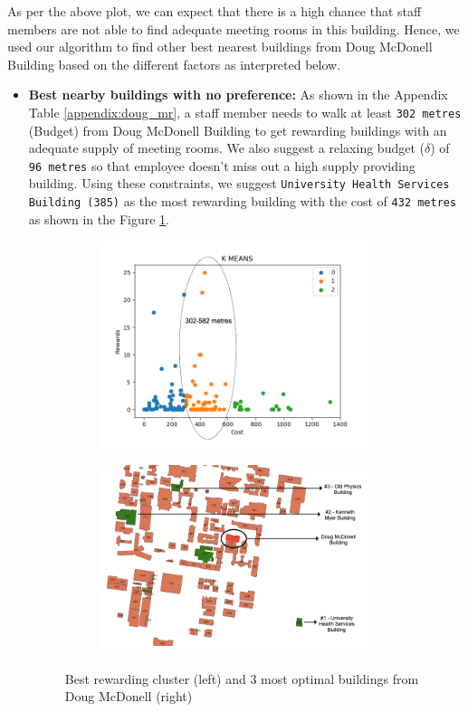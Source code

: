 As per the above plot, we can expect that there is a high chance that staff members are not able to find adequate meeting rooms in this building. Hence, we used our algorithm to find other best nearest buildings from Doug McDonell Building based on the different factors as interpreted below.

\begin{itemize}
    \item \textbf{Best nearby buildings with no preference:} As shown in the Appendix Table \ref{appendix:doug_mr}, a staff member needs to walk at least \texttt{302 metres} (Budget) from Doug McDonell Building to get rewarding buildings with an adequate supply of meeting rooms. We also suggest a relaxing budget ($\delta$) of \texttt{96 metres} so that employee doesn't miss out a high supply providing building. Using these constraints, we suggest \texttt{University Health Services Building (385)} as the most rewarding building with the cost of \texttt{432 metres} as shown in the Figure \ref{fig:doug-mr-no-factors}.
    
\begin{figure}[H]
\begin{subfigure}{.5\textwidth}
\centering
  \includegraphics[width=8cm]{resources/images/spatial-mr/doug-mr-results/clusters_reward.png}
\end{subfigure}%
\begin{subfigure}{.5\textwidth}
  \centering
  \includegraphics[width=8cm]{resources/images/spatial-mr/doug-mr-results/mr_spatial_view.png}
\end{subfigure}
\caption{Best rewarding cluster (left) and 3 most optimal buildings from Doug McDonell (right)}
\label{fig:doug-mr-no-factors}
\end{figure}


\end{itemize}
